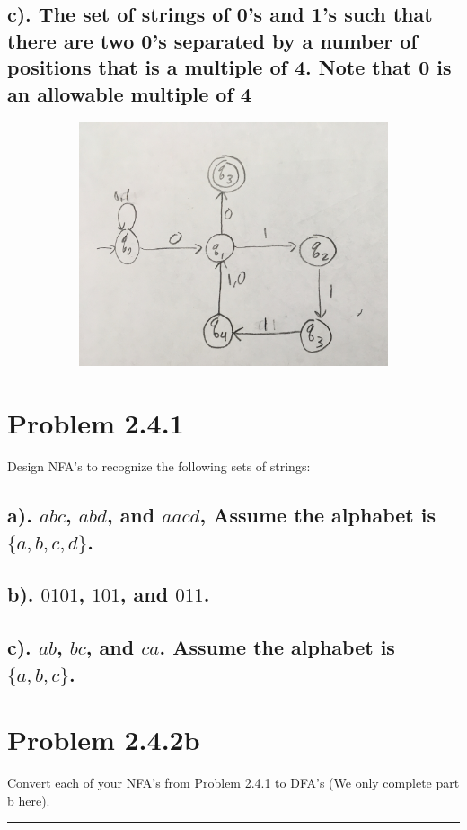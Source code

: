 \documentclass[20pt]{article} %
\begin{document}
\subsection{c). The set of strings of 0's and 1's such that there are two 0's separated by a number of positions that is a multiple of 4. Note that 0 is an allowable multiple of 4}
\begin{figure}[!htbp]
  	\centering
   	\begin{subfigure}[p]{0.7\linewidth}
    	\includegraphics[width=\linewidth]{./figures/h2-5.jpg}
   	\end{subfigure}
\end{figure}


\section{Problem 2.4.1}
Design NFA's to recognize the following sets of strings:

\subsection{a). $abc$, $abd$, and $aacd$, Assume the alphabet is $\{a,b,c,d\}$.}

\subsection{b). $0101$, $101$, and $011$.}

\subsection{c). $ab$, $bc$, and $ca$. Assume the alphabet is $\{a,b,c\}$. }

\section{Problem 2.4.2b}
Convert each of your NFA's from Problem 2.4.1 to DFA's (We only complete part b here).
\noindent\rule{2cm}{0.4pt} \\
\end{document}

